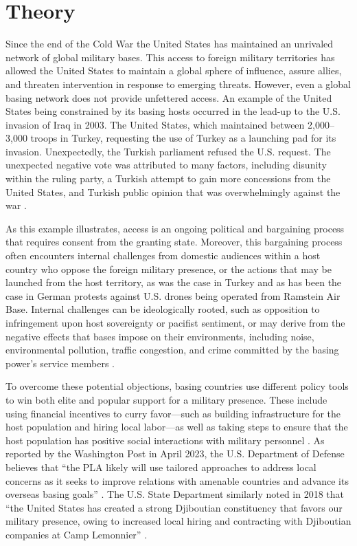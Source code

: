 \section*{Theory}

Since the end of the Cold War the United States has maintained an unrivaled network of global military bases. This access to foreign military territories has allowed the United States to maintain a global sphere of influence, assure allies, and threaten intervention in response to emerging threats. However, even a global basing network does not provide unfettered access. An example of the United States being constrained by its basing hosts occurred in the lead-up to the U.S. invasion of Iraq in 2003. The United States, which maintained between 2,000–3,000 troops in Turkey, requesting the use of Turkey as a launching pad for its invasion. Unexpectedly, the Turkish parliament refused the U.S. request. The unexpected negative vote was attributed to many factors, including disunity within the ruling party, a Turkish attempt to gain more concessions from the United States, and Turkish public opinion that was overwhelmingly against the war \cite{otterman2005}. 

As this example illustrates, access is an ongoing political and bargaining process that requires consent from the granting state. Moreover, this bargaining process often encounters internal challenges from domestic audiences within a host country who oppose the foreign military presence, or the actions that may be launched from the host territory, as was the case in Turkey and as has been the case in German protests against U.S. drones being operated from Ramstein Air Base. Internal challenges can be ideologically rooted, such as opposition to infringement upon host sovereignty or pacifist sentiment, or may derive from the negative effects that bases impose on their environments, including noise, environmental pollution, traffic congestion, and crime committed by the basing power's service members \cite{kim2023}.

To overcome these potential objections, basing countries use different policy tools to win both elite and popular support for a military presence. These include using financial incentives to curry favor---such as building infrastructure for the host population and hiring local labor—as well as taking steps to ensure that the host population has positive social interactions with military personnel \cite{allen2020,blankenship2020,allen2023}. As reported by the Washington Post in April 2023, the U.S. Department of Defense believes that ``the PLA likely will use tailored approaches to address local concerns as it seeks to improve relations with amenable countries and advance its overseas basing goals'' \cite{hudson2023}. The U.S. State Department similarly noted in 2018 that ``the United States has created a strong Djiboutian constituency that favors our military presence, owing to increased local hiring and contracting with Djiboutian companies at Camp Lemonnier'' \cite{state2018}. 

